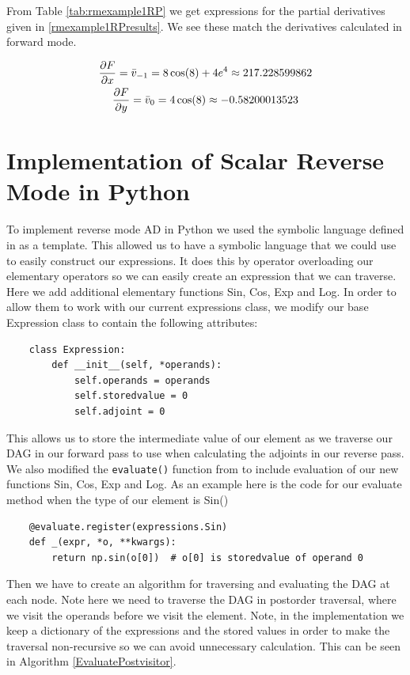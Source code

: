 \documentclass{article}
\begin{document}
From Table \ref{tab:rmexample1RP} we get expressions for the partial derivatives given in \eqref{rmexample1RPresults}. We see these  match the  derivatives calculated in forward mode.

\begin{equation} \label{rmexample1RPresults}
    \begin{gathered}
    \frac{\partial F}{\partial x} = \Bar{v}_{-1} = 8\cos(8) + 4e^4 \approx 217.228599862 \\
    \frac{\partial F}{\partial y} = \Bar{v}_0 =  4\cos(8) \approx -0.58200013523
    \end{gathered}
\end{equation}

\section{Implementation of Scalar Reverse Mode in Python}

To implement reverse mode AD in Python we used the symbolic language defined in \cite{PoPBook} as a template. This allowed us to have a symbolic language that we could use to easily construct our expressions. It does this by operator overloading our elementary operators so we can easily create an expression that we can traverse. Here we add additional elementary functions Sin, Cos, Exp and Log. In order to allow them to work with our current expressions class, we modify our base Expression class to contain the following attributes:
\begin{verbatim}
    class Expression:
        def __init__(self, *operands):
            self.operands = operands
            self.storedvalue = 0
            self.adjoint = 0
\end{verbatim}
This allows us to store the intermediate value of our element as we traverse our DAG in our forward pass to use when calculating the adjoints in our reverse pass. We also modified the \verb|evaluate()| function from \cite{PoPBook} to include evaluation of our new functions Sin, Cos, Exp and Log. As an example here is the code for our evaluate method when the type of our element is Sin()
\begin{verbatim}
    @evaluate.register(expressions.Sin)
    def _(expr, *o, **kwargs):
        return np.sin(o[0])  # o[0] is storedvalue of operand 0
\end{verbatim}

Then we have to create an algorithm for traversing and evaluating the DAG at each node. Note here we need to traverse the DAG in postorder traversal, where we visit the operands before we visit the element. Note, in the implementation we keep a dictionary of the expressions and the stored values in order to make the traversal non-recursive so we can avoid unnecessary calculation. This can be seen in Algorithm \ref{EvaluatePostvisitor}.
\end{document}
